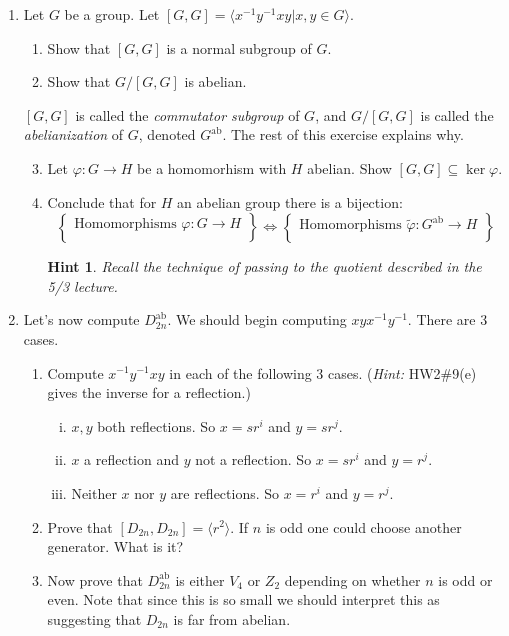 \documentclass[11pt]{article}
\newtheorem*{hint}{Hint}
\newcommand{\la}{\langle}
\newcommand{\ra}{\rangle}
\newcommand{\ab}{\mathrm{ab}}
\begin{document}
\begin{enumerate}
\begin{enumerate}
    \end{enumerate}
\item Let $G$ be a group.  Let $[G,G] = \la x^{-1}y^{-1}xy | x,y\in G\ra$.
  \begin{enumerate}
    \item Show that $[G,G]$ is a normal subgroup of $G$.
    \item Show that $G/[G,G]$ is abelian.
  \end{enumerate}
  $[G,G]$ is called the \textit{commutator subgroup} of $G$, and $G/[G,G]$ is called the \textit{abelianization} of $G$, denoted $G^\ab$.  The rest of this exercise explains why.
  \begin{enumerate}
    \setcounter{enumii}{2}
    \item Let $\varphi:G\to H$ be a homomorhism with $H$ abelian.  Show $[G,G]\subseteq\ker\varphi$.
    \item Conclude that for $H$ an abelian group there is a bijection:
    \[\left\{
    \begin{array}{c}
      \text{Homomorphisms }\varphi:G\to H\\
    \end{array}\right\}
    \Longleftrightarrow
    \left\{
    \begin{array}{c}
      \text{Homomorphisms }\tilde\varphi:G^\ab\to H\\
    \end{array}
    \right\}
    \]
    \begin{hint}
      Recall the technique of passing to the quotient described in the 5/3 lecture.
    \end{hint}
  \end{enumerate}
  \item Let's now compute $D_{2n}^\ab$.  We should begin computing $xyx^{-1}y^{-1}$.  There are 3 cases.
  \begin{enumerate}
    \item Compute $x^{-1}y^{-1}xy$ in each of the following 3 cases. (\textit{Hint:} HW2\#9(e) gives the inverse for a reflection.)
    \begin{enumerate}[(i)]
      \item $x,y$ both reflections.  So $x=sr^i$ and $y=sr^j$.
      \item $x$ a reflection and $y$ not a reflection.  So $x=sr^i$ and $y=r^j$.
      \item Neither $x$ nor $y$ are reflections.  So $x=r^i$ and $y=r^j$.
    \end{enumerate}
    \item Prove that $[D_{2n},D_{2n}] = \la r^2\ra$.  If $n$ is odd one could choose another generator.  What is it?
    \item Now prove that $D_{2n}^\ab$ is either $V_4$ or $Z_2$ depending on whether $n$ is odd or even.  Note that since this is so small we should interpret this as suggesting that $D_{2n}$ is far from abelian.
    \end{enumerate}
    \end{enumerate}
\end{document}
